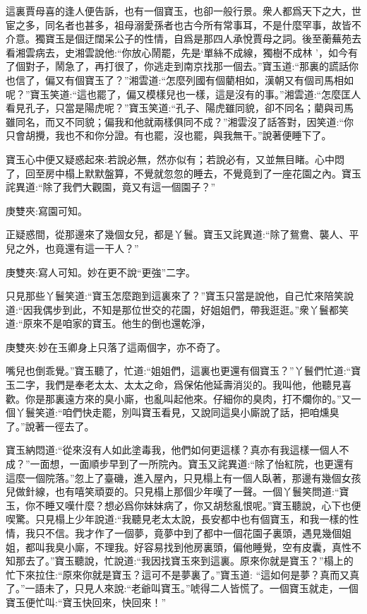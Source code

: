 \begin{parag}
    這裏賈母喜的逢人便告訴，也有一個寶玉，也卻一般行景。衆人都爲天下之大，世宦之多，同名者也甚多，祖母溺愛孫者也古今所有常事耳，不是什麼罕事，故皆不介意。獨寶玉是個迂闊呆公子的性情，自爲是那四人承悅賈母之詞。後至蘅蕪苑去看湘雲病去，史湘雲說他:“你放心鬧罷，先是‘單絲不成線，獨樹不成林 ’，如今有了個對子，鬧急了，再打很了，你逃走到南京找那一個去。”寶玉道:“那裏的謊話你也信了，偏又有個寶玉了？”湘雲道:“怎麼列國有個藺相如，漢朝又有個司馬相如呢？”寶玉笑道:“這也罷了，偏又模樣兒也一樣，這是沒有的事。”湘雲道:“怎麼匡人看見孔子，只當是陽虎呢？”寶玉笑道:“孔子、陽虎雖同貌，卻不同名；藺與司馬雖同名，而又不同貌；偏我和他就兩樣俱同不成？”湘雲沒了話答對，因笑道:“你只會胡攪，我也不和你分證。有也罷，沒也罷，與我無干。”說著便睡下了。
\end{parag}


\begin{parag}
    寶玉心中便又疑惑起來:若說必無，然亦似有；若說必有，又並無目睹。心中悶了，回至房中榻上默默盤算，不覺就忽忽的睡去，不覺竟到了一座花園之內。寶玉詫異道:“除了我們大觀園，竟又有這一個園子？”\begin{note}庚雙夾:寫園可知。\end{note}正疑惑間，從那邊來了幾個女兒，都是丫鬟。寶玉又詫異道:“除了鴛鴦、襲人、平兒之外，也竟還有這一干人？”\begin{note}庚雙夾:寫人可知。妙在更不說“更強”二字。\end{note}只見那些丫鬟笑道:“寶玉怎麼跑到這裏來了？”寶玉只當是說他，自己忙來陪笑說道:“因我偶步到此，不知是那位世交的花園，好姐姐們，帶我逛逛。”衆丫鬟都笑道:“原來不是咱家的寶玉。他生的倒也還乾淨，\begin{note}庚雙夾:妙在玉卿身上只落了這兩個字，亦不奇了。\end{note}嘴兒也倒乖覺。”寶玉聽了，忙道:“姐姐們，這裏也更還有個寶玉？”丫鬟們忙道:“寶玉二字，我們是奉老太太、太太之命，爲保佑他延壽消災的。我叫他，他聽見喜歡。你是那裏遠方來的臭小廝，也亂叫起他來。仔細你的臭肉，打不爛你的。”又一個丫鬟笑道:“咱們快走罷，別叫寶玉看見，又說同這臭小廝說了話，把咱燻臭了。”說著一徑去了。
\end{parag}


\begin{parag}
    寶玉納悶道:“從來沒有人如此塗毒我，他們如何更這樣？真亦有我這樣一個人不成？”一面想，一面順步早到了一所院內。寶玉又詫異道:“除了怡紅院，也更還有這麼一個院落。”忽上了臺磯，進入屋內，只見榻上有一個人臥著，那邊有幾個女孩兒做針線，也有嘻笑頑耍的。只見榻上那個少年嘆了一聲。一個丫鬟笑問道:“寶玉，你不睡又嘆什麼？想必爲你妹妹病了，你又胡愁亂恨呢。”寶玉聽說，心下也便喫驚。只見榻上少年說道:“我聽見老太太說，長安都中也有個寶玉，和我一樣的性情，我只不信。我才作了一個夢，竟夢中到了都中一個花園子裏頭，遇見幾個姐姐，都叫我臭小廝，不理我。好容易找到他房裏頭，偏他睡覺，空有皮囊，真性不知那去了。”寶玉聽說，忙說道:“我因找寶玉來到這裏。原來你就是寶玉？”榻上的忙下來拉住:“原來你就是寶玉？這可不是夢裏了。”寶玉道: “這如何是夢？真而又真了。”一語未了，只見人來說:“老爺叫寶玉。”唬得二人皆慌了。一個寶玉就走，一個寶玉便忙叫:“寶玉快回來，快回來！”
\end{parag}


